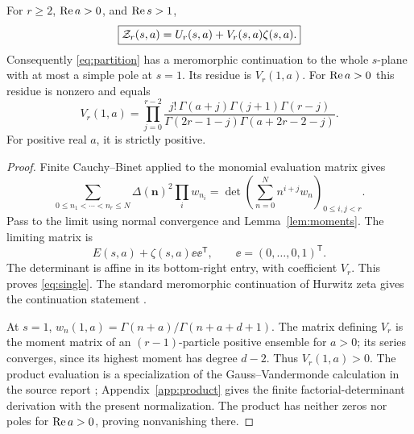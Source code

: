 \begin{theorem}\label{thm:single}
For $r\ge2$, $\operatorname{Re} a>0$, and $\operatorname{Re} s>1$,
\begin{equation}\label{eq:single}
 \boxed{\displaystyle\mathcal Z_r(s,a)=U_r(s,a)+V_r(s,a)\zeta(s,a).}
\end{equation}
Consequently \eqref{eq:partition} has a meromorphic continuation to the
whole $s$-plane with at most a simple pole at $s=1$. Its residue is
$V_r(1,a)$. For $\operatorname{Re} a>0$ this residue is nonzero and equals
\begin{equation}\label{eq:residue-product}
 V_r(1,a)=\prod_{j=0}^{r-2}
 \frac{j!\,\Gamma(a+j)\Gamma(j+1)\Gamma(r-j)}
 {\Gamma(2r-1-j)\Gamma(a+2r-2-j)}.
\end{equation}
For positive real $a$, it is strictly positive.
\end{theorem}
\begin{proof}
Finite Cauchy--Binet applied to the monomial evaluation matrix gives
\[
 \sum_{0\le n_1<\cdots<n_r\le N}\Delta(\bm n)^2\prod_i w_{n_i}
   =\det\left(\sum_{n=0}^N n^{i+j}w_n\right)_{0\le i,j<r}.
\]
Pass to the limit using normal convergence and
Lemma~\ref{lem:moments}. The limiting matrix is
\[
 E(s,a)+\zeta(s,a)\ee\ee^{\mathsf T},\qquad
 \ee=(0,\ldots,0,1)^{\mathsf T}.
\]
The determinant is affine in its bottom-right entry, with coefficient
$V_r$. This proves \eqref{eq:single}. The standard meromorphic
continuation of Hurwitz zeta gives the continuation statement
\cite{dlmf:hurwitz}.

At $s=1$, $w_n(1,a)=\Gamma(n+a)/\Gamma(n+a+d+1)$.
The matrix defining $V_r$ is the moment matrix of an $(r-1)$-particle
positive ensemble for $a>0$; its series converges, since its highest
moment has degree $d-2$. Thus $V_r(1,a)>0$. The product evaluation is
a specialization of the Gauss--Vandermonde calculation in the source
report \cite{repo:dhr}; Appendix~\ref{app:product} gives the finite
factorial-determinant derivation with the present normalization. The product
has neither zeros nor poles for $\operatorname{Re} a>0$, proving nonvanishing there.
\end{proof}

